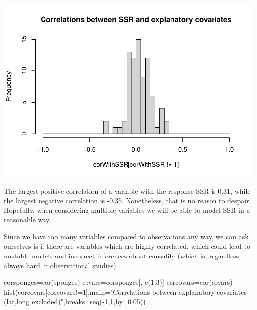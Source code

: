 \documentclass[
]{book}
\newenvironment{Shaded}{\begin{snugshade}}{\end{snugshade}}
\newcommand{\AttributeTok}[1]{\textcolor[rgb]{0.77,0.63,0.00}{#1}}
\newcommand{\DecValTok}[1]{\textcolor[rgb]{0.00,0.00,0.81}{#1}}
\newcommand{\FloatTok}[1]{\textcolor[rgb]{0.00,0.00,0.81}{#1}}
\newcommand{\FunctionTok}[1]{\textcolor[rgb]{0.00,0.00,0.00}{#1}}
\newcommand{\NormalTok}[1]{#1}
\newcommand{\OtherTok}[1]{\textcolor[rgb]{0.56,0.35,0.01}{#1}}
\newcommand{\SpecialCharTok}[1]{\textcolor[rgb]{0.00,0.00,0.00}{#1}}
\newcommand{\StringTok}[1]{\textcolor[rgb]{0.31,0.60,0.02}{#1}}
\begin{document}
\includegraphics{ECOMODbook_files/figure-latex/unnamed-chunk-22-1.pdf}

The largest positive correlation of a variable with the response SSR is 0.31, while the largest negative correlation is -0.35. Nonetheless, that is no reason to despair. Hopefully, when considering multiple variables we will be able to model SSR in a reasonable way.

Since we have too many variables compared to observations any way, we can ask ourselves is if there are variables which are highly correlated, which could lead to unstable models and incorrect inferences about causality (which is, regardless, always hard in observational studies).

\begin{Shaded}
\begin{Highlighting}[]
\NormalTok{corsponges}\OtherTok{=}\FunctionTok{cor}\NormalTok{(sponges)}
\NormalTok{covars}\OtherTok{=}\NormalTok{corsponges[,}\SpecialCharTok{{-}}\FunctionTok{c}\NormalTok{(}\DecValTok{1}\SpecialCharTok{:}\DecValTok{3}\NormalTok{)]}
\NormalTok{corcovars}\OtherTok{=}\FunctionTok{cor}\NormalTok{(covars)}
\FunctionTok{hist}\NormalTok{(corcovars[corcovars}\SpecialCharTok{!=}\DecValTok{1}\NormalTok{],}\AttributeTok{main=}\StringTok{"Correlations between explanatory covariates (lat,long excluded)"}\NormalTok{,}\AttributeTok{breaks=}\FunctionTok{seq}\NormalTok{(}\SpecialCharTok{{-}}\DecValTok{1}\NormalTok{,}\DecValTok{1}\NormalTok{,}\AttributeTok{by=}\FloatTok{0.05}\NormalTok{))}
\end{Highlighting}
\end{Shaded}
\end{document}
